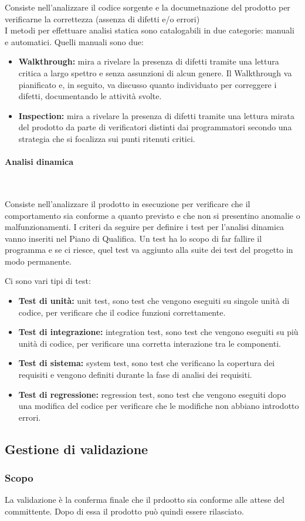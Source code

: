 Consiste nell'analizzare il codice sorgente e la documetnazione del prodotto per verificarne la correttezza (assenza di difetti e/o errori)\\
I metodi per effettuare analisi statica sono catalogabili in due categorie: manuali e automatici.
Quelli manuali sono due:
\begin{itemize}
    \item \textbf{Walkthrough:} mira a rivelare la presenza di difetti tramite una lettura critica a largo spettro e senza assunzioni di alcun genere. Il Walkthrough va pianificato e, in seguito, va discusso quanto individuato per correggere i difetti, documentando le attività svolte.
    \item \textbf{Inspection:} mira a rivelare la presenza di difetti tramite una lettura mirata del prodotto da parte di verificatori distinti dai programmatori secondo una strategia che si focalizza sui punti ritenuti critici. 
\end{itemize}

\paragraph{Analisi dinamica} ~

Consiste nell'analizzare il prodotto in esecuzione per verificare che il comportamento sia conforme a quanto previsto e che non si presentino anomalie o malfunzionamenti.
I criteri da seguire per definire i test per l'analisi dinamica vanno inseriti nel Piano di Qualifica. Un test ha lo scopo di far fallire il programma e se ci riesce, quel test va aggiunto alla suite dei test del progetto in modo permanente.

Ci sono vari tipi di test:
\begin{itemize}
    \item \textbf{Test di unità:} unit test, sono test che vengono eseguiti su singole unità di codice, per verificare che il codice funzioni correttamente.
    \item \textbf{Test di integrazione:} integration test, sono test che vengono eseguiti su più unità di codice, per verificare una corretta interazione tra le componenti.
    \item \textbf{Test di sistema:} system test, sono test che verificano la copertura dei requisiti e vengono definiti durante la fase di analisi dei requisiti.
    \item \textbf{Test di regressione:} regression test, sono test che vengono eseguiti dopo una modifica del codice per verificare che le modifiche non abbiano introdotto errori.
\end{itemize}

\subsection{Gestione di validazione}
\subsubsection{Scopo} 
La validazione è la conferma finale che il prdootto sia conforme alle attese del committente. Dopo di essa il prodotto può quindi essere rilasciato.\\


